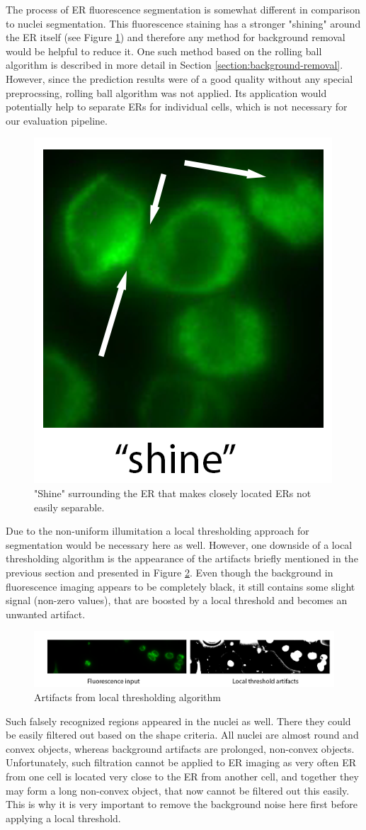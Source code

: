 The process of ER fluorescence segmentation is somewhat different in comparison to nuclei segmentation. This fluorescence staining has a stronger "shining" around the ER itself (see Figure \ref{fig:shine-er}) and therefore any method for background removal would be helpful to reduce it. One such method based on the rolling ball algorithm is described in more detail in Section \ref{section:background-removal}. However, since the prediction results were of a good quality without any special preprocssing, rolling ball algorithm was not applied. Its application would potentially help to separate ERs for individual cells, which is not necessary for our evaluation pipeline.

\begin{figure}[htb]
	\begin{center}
		\includegraphics[width=0.2\linewidth]{bilder/ER/shine.png}
		\caption{"Shine" surrounding the ER that makes closely located ERs not easily separable.}\label{fig:shine-er}
	\end{center}
\end{figure}

Due to the non-uniform illumitation a local thresholding approach for segmentation would be necessary here as well. However, one downside of a local thresholding algorithm is the appearance of the artifacts briefly mentioned in the previous section and presented in Figure \ref{fig:artifacts-er}. Even though the background in fluorescence imaging appears to be completely black, it still contains some slight signal (non-zero values), that are boosted by a local threshold and becomes an unwanted artifact. 
\begin{figure}[H]
	\begin{center}
		\includegraphics[width=\linewidth]{bilder/ER/artifacts.png}
		\caption{Artifacts from local thresholding algorithm}\label{fig:artifacts-er}
	\end{center}
\end{figure}
Such falsely recognized regions appeared in the nuclei as well. There they could be easily filtered out based on the shape criteria. All nuclei are almost round and convex objects, whereas background artifacts are prolonged, non-convex objects. Unfortunately, such filtration cannot be applied to ER imaging as very often ER from one cell is located very close to the ER from another cell, and together they may form a long non-convex object, that now cannot be filtered out this easily. This is why it is very important to remove the background noise here first before applying a local threshold.


